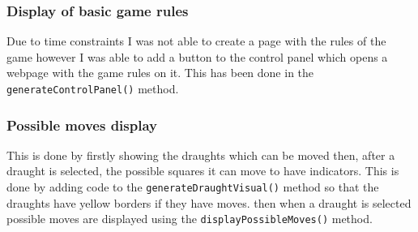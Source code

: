 \documentclass[a4paper,12pt]{scrartcl}
\begin{document}
{{			\subsubsection{Display of basic game rules}{
				Due to time constraints I was not able to create a page with the rules of the game however I was able to add a button to the control panel which opens a webpage with the game rules on it. This has been done in the \lstinline|generateControlPanel()| method.
			}
			\subsubsection{Possible moves display}{
				This is done by firstly showing the draughts which can be moved then, after a draught is selected, the possible squares it can move to have indicators. This is done by adding code to the \lstinline|generateDraughtVisual()| method so that the draughts have yellow borders if they have moves. then when a draught is selected possible moves are displayed using the \lstinline|displayPossibleMoves()| method.
			}
		}
		
	}
	
	
	\newpage
	
	\printbibliography[heading=bibintoc,title=References]
\end{document}

